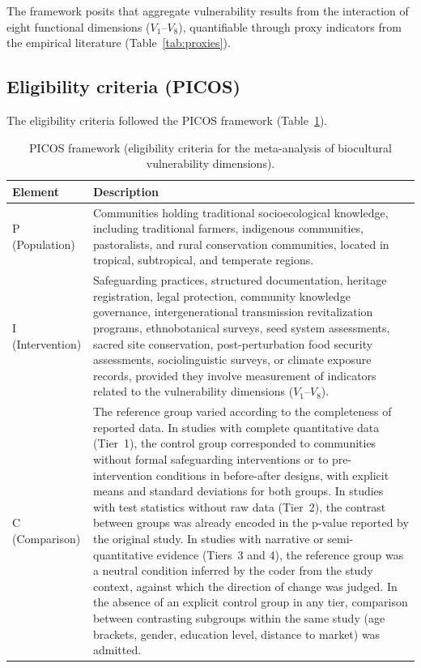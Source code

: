 \documentclass[12pt,a4paper]{article}
\begin{document}
The framework posits that aggregate vulnerability results from the interaction of eight functional dimensions ($V_1$--$V_8$), quantifiable through proxy indicators from the empirical literature (Table~\ref{tab:proxies}).

\subsection{Eligibility criteria (PICOS)}
\label{sec:picos}

The eligibility criteria followed the PICOS framework (Table~\ref{tab:picos}).

\begin{table}[htbp]
\caption{PICOS framework (eligibility criteria for the meta-analysis of biocultural vulnerability dimensions).}
\label{tab:picos}
\centering
\small
\begin{tabular}{p{3.5cm} p{9.5cm}}
\toprule
\textbf{Element} & \textbf{Description} \\
\midrule
P (Population) & Communities holding traditional socioecological knowledge, including traditional farmers, indigenous communities, pastoralists, and rural conservation communities, located in tropical, subtropical, and temperate regions. \\
I (Intervention) & Safeguarding practices, structured documentation, heritage registration, legal protection, community knowledge governance, intergenerational transmission revitalization programs, ethnobotanical surveys, seed system assessments, sacred site conservation, post-perturbation food security assessments, sociolinguistic surveys, or climate exposure records, provided they involve measurement of indicators related to the vulnerability dimensions ($V_1$--$V_8$). \\
C (Comparison) & The reference group varied according to the completeness of reported data. In studies with complete quantitative data (Tier~1), the control group corresponded to communities without formal safeguarding interventions or to pre-intervention conditions in before-after designs, with explicit means and standard deviations for both groups. In studies with test statistics without raw data (Tier~2), the contrast between groups was already encoded in the p-value reported by the original study. In studies with narrative or semi-quantitative evidence (Tiers~3 and 4), the reference group was a neutral condition inferred by the coder from the study context, against which the direction of change was judged. In the absence of an explicit control group in any tier, comparison between contrasting subgroups within the same study (age brackets, gender, education level, distance to market) was admitted. \\

\end{tabular}
\end{table}
\end{document}

